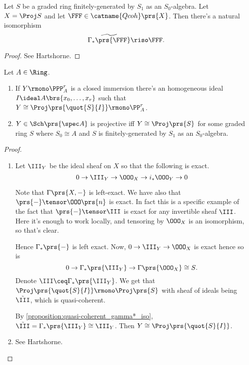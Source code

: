 \documentclass[10pt,a4paper,twoside,openany,hidelinks]{book}
\begin{document}
\begin{proposition} \label{proposition:quasi-coherent_gamma*_iso}
Let $S$ be a graded ring finitely-generated by $S_1$ as an $S_0$-algebra. Let $X = \Proj S$ and let $\FFF \in \catname{Qcoh}\prs{X}$. Then there's a natural isomorphism
\[\widetilde{\Gamma_*\prs{\FFF}} \riso \FFF \text{.}\]
\end{proposition}

\begin{proof}
See Hartshorne.
\end{proof}

\begin{corollary}
Let $A \in \Ring$.
\begin{enumerate}
\item If $Y \rmono \PPP_A^r$ is a closed immersion there's an homogeneous ideal $I \ideal A\brs{x_0, \ldots, x_r}$ such that $Y \cong \Proj\prs{\quot{S}{I}} \rmono \PP_A^r$.
\item $Y \in \Sch\prs{\spec A}$ is projective iff $Y \cong \Proj\prs{S}$ for some graded ring $S$ where $S_0 \cong A$ and $S$ is finitely-generated by $S_1$ as an $S_0$-algebra.
\end{enumerate}
\end{corollary}

\begin{proof}
\begin{enumerate}
\item Let $\III_Y$ be the ideal sheaf on $X$ so that the following is exact.
\[0 \to \III_Y \to \OOO_X \to i_* \OOO_Y \to 0\]

Note that $\Gamma\prs{X, -}$ is left-exact. We have also that $\prs{-} \tensor \OOO\prs{n}$ is exact. In fact this is a specific example of the fact that $\prs{-} \tensor \III$ is exact for any invertible sheaf $\III$. Here it's enough to work locally, and tensoring by $\OOO_X$ is an isomorphism, so that's clear.

Hence $\Gamma_*\prs{-}$ is left exact.
Now, $0 \to \III_Y \to \OOO_X$ is exact hence so is
\[0 \to \Gamma_*\prs{\III_Y} \to \Gamma\prs{\OOO_X} \cong S \text{.}\]
Denote $\III \ceq \Gamma_*\prs{\III_Y}$.
We get that $\Proj \prs{\quot{S}{I}} \rmono \Proj\prs{S}$ with sheaf of ideals being $\tilde{\III}$, which is quasi-coherent.

By \ref{proposition:quasi-coherent_gamma*_iso}, $\tilde{\III} = \Gamma_*\prs{\III_Y} \cong \III_Y$.
Then $Y \cong \Proj\prs{\quot{S}{I}}$.

\item See Hartshorne.
\end{enumerate}
\end{proof}
\end{document}
